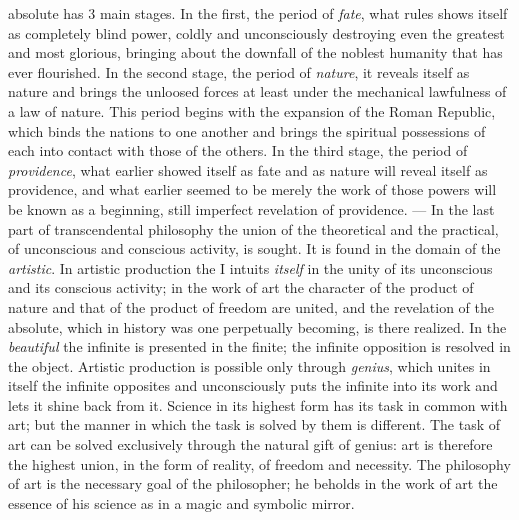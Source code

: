 absolute has 3 main stages. In the first, the period of \emph{fate}, what
rules shows itself as completely blind power, coldly and unconsciously
destroying even the greatest and most glorious, bringing about the
downfall of the noblest humanity that has ever flourished. In the second
stage, the period of \emph{nature}, it reveals itself as nature and
brings the unloosed forces at least under the mechanical lawfulness of a
law of nature. This period begins with the expansion of the Roman
Republic, which binds the nations to one another and brings the spiritual
possessions of each into contact with those of the others. In the third
stage, the period of \emph{providence}, what earlier showed itself as
fate and as nature will reveal itself as providence, and what earlier
seemed to be merely the work of those powers will be known as a
beginning, still imperfect revelation of providence. --- In the last part
of transcendental philosophy the union of the theoretical and the
practical, of unconscious and conscious activity, is sought. It is found
in the domain of the \emph{artistic}. In artistic production the I
intuits \emph{itself} in the unity of its unconscious and its conscious
activity; in the work of art the character of the product of nature and
that of the product of freedom are united, and the revelation of the
absolute, which in history was one perpetually becoming, is there
realized. In the \emph{beautiful} the infinite is presented in
the finite; the infinite opposition is resolved in the object. Artistic
production is possible only through \emph{genius}, which unites in itself
the infinite opposites and unconsciously puts the infinite into its work
and lets it shine back from it. Science in its highest form has its task
in common with art; but the manner in which the task is solved by them is
different. The task of art can be solved exclusively through the natural
gift of genius: art is therefore the highest union, in the form of
reality, of freedom and necessity. The philosophy of art is the necessary
goal of the philosopher; he beholds in the work of art the essence of his
science as in a magic and symbolic mirror.

